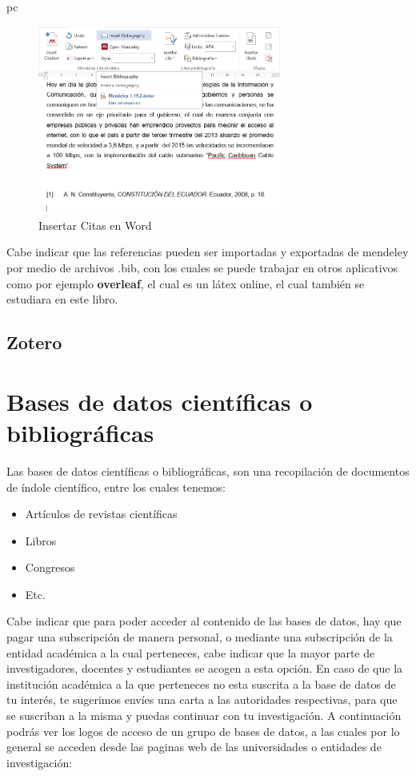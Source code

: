 pc\documentclass[a4paper,12pt,openany]{book}
\begin{document}
\begin{itemize}
        \begin{figure}[H]
        \centering
    	\includegraphics[width=8cm]{mendeley26.png}
        \caption{Insertar Citas en Word}
        \label{fig:mendeley29}
        \end{figure}

Cabe indicar que las referencias pueden ser importadas y exportadas de mendeley por medio de archivos .bib, con los cuales se puede trabajar en otros aplicativos como por ejemplo \textbf{overleaf}, el cual es un látex online, el cual también se estudiara en este libro.

\clearpage

\section{Zotero}

\chapter{Bases de datos científicas o bibliográficas}\label{sec:basesdedatos}

Las bases de datos científicas o bibliográficas, son una recopilación de documentos de índole científico, entre los cuales tenemos: 

\begin{itemize}
\item Artículos de revistas científicas
\item Libros
\item Congresos
\item Etc.
\end{itemize}

Cabe indicar que para poder acceder al contenido de las bases de datos, hay que pagar una subscripción de manera personal, o mediante una subscripción de la entidad académica a la cual perteneces, cabe indicar que la mayor parte de investigadores, docentes y estudiantes se acogen a esta opción. En caso de que la institución académica a la que perteneces no esta suscrita a la base de datos de tu interés, te sugerimos envíes una carta a las autoridades respectivas, para que se suscriban a la misma y puedas continuar con tu investigación. A continuación podrás ver los logos de acceso de un grupo de bases de datos, a las cuales por lo general se acceden desde las paginas web de las universidades o entidades de investigación:


\end{itemize}
\end{document}
